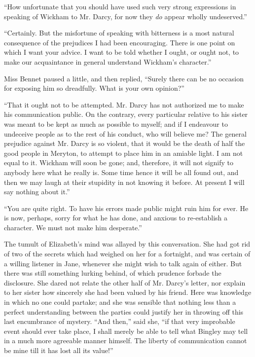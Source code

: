\documentclass[12pt]{book}
\begin{document}
``How unfortunate that you should have used such very strong expressions in speaking of Wickham to Mr. Darcy, for now they \textit{do} appear wholly undeserved.''

``Certainly. But the misfortune of speaking with bitterness is a most natural consequence of the prejudices I had been encouraging. There is one point on which I want your advice. I want to be told whether I ought, or ought not, to make our acquaintance in general understand Wickham's character.''

Miss Bennet paused a little, and then replied, ``Surely there can be no occasion for exposing him so dreadfully. What is your own opinion?''

``That it ought not to be attempted. Mr. Darcy has not authorized me to make his communication public. On the contrary, every particular relative to his sister was meant to be kept as much as possible to myself; and if I endeavour to undeceive people as to the rest of his conduct, who will believe me? The general prejudice against Mr. Darcy is so violent, that it would be the death of half the good people in Meryton, to attempt to place him in an amiable light. I am not equal to it. Wickham will soon be gone; and, therefore, it will not signify to anybody here what he really is. Some time hence it will be all found out, and then we may laugh at their stupidity in not knowing it before. At present I will say nothing about it.''

``You are quite right. To have his errors made public might ruin him for ever. He is now, perhaps, sorry for what he has done, and anxious to re-establish a character. We must not make him desperate.''

The tumult of Elizabeth's mind was allayed by this conversation. She had got rid of two of the secrets which had weighed on her for a fortnight, and was certain of a willing listener in Jane, whenever she might wish to talk again of either. But there was still something lurking behind, of which prudence forbade the disclosure. She dared not relate the other half of Mr. Darcy's letter, nor explain to her sister how sincerely she had been valued by his friend. Here was knowledge in which no one could partake; and she was sensible that nothing less than a perfect understanding between the parties could justify her in throwing off this last encumbrance of mystery. ``And then,'' said she, ``if that very improbable event should ever take place, I shall merely be able to tell what Bingley may tell in a much more agreeable manner himself. The liberty of communication cannot be mine till it has lost all its value!''
\end{document}
